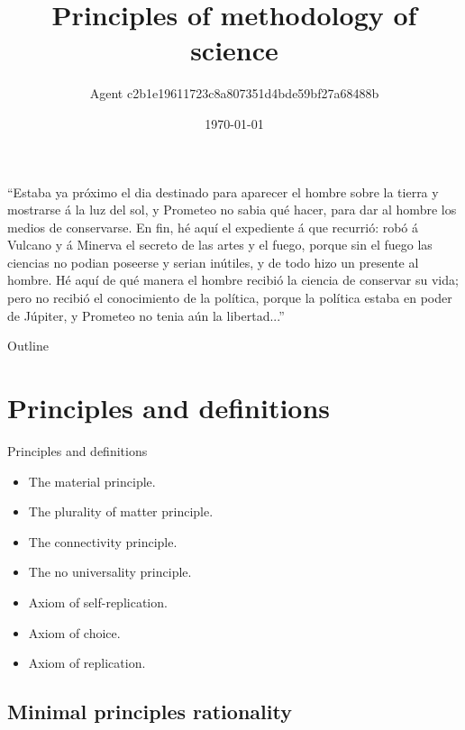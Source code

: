 \documentclass{beamer}
\title[]{Principles of methodology of science}
\author[] %
{Agent c2b1e19611723c8a807351d4bde59bf27a68488b}
\institute[Independent (no affiliation)] %
{
Independent (no affiliation)
}
\date[\today] %
{\today}
\begin{document}
\begin{frame}
  \titlepage
\end{frame}

\begin{frame}

\enquote{Estaba ya próximo el dia destinado para aparecer el hombre sobre la tierra y mostrarse á la luz del sol, y Prometeo no sabia qué hacer, para dar al hombre los medios de conservarse. En fin, hé aquí el expediente á que recurrió: robó á Vulcano y á Minerva el secreto de las artes y el fuego, porque sin el fuego las ciencias no podian poseerse y serian inútiles, y de todo hizo un presente al hombre. Hé aquí de qué manera el hombre recibió la ciencia de conservar su vida; pero no recibió el conocimiento de la política, porque la política estaba en poder de Júpiter, y Prometeo no tenia aún la libertad...}


\end{frame}

\begin{frame}{Outline}
  \tableofcontents
\end{frame}

\section{Principles and definitions}

\begin{frame}{Principles and definitions}{}
  \begin{itemize}
  \item The material principle.
  \item The plurality of matter principle.
  \item The connectivity principle.
  \item The no universality principle.
  \item Axiom of self-replication.
  \item Axiom of choice.
  \item Axiom of replication.
  \end{itemize}
\end{frame}

\subsection{Minimal principles rationality}
\end{document}
